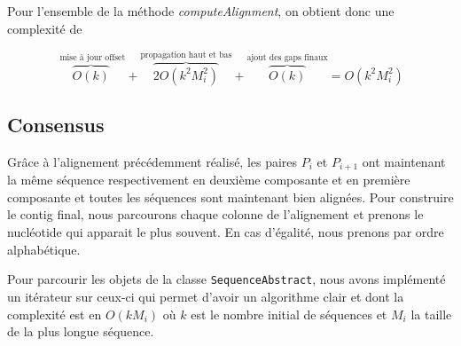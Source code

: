 Pour l'ensemble de la méthode \emph{computeAlignment}, on obtient donc une
complexité de

\begin{equation}
	\overbrace{O(k)}^{\text{ mise à jour offset}} + \overbrace{2 O(k^{2}
	M_{i}^{2})}^{\text{propagation haut et bas}} + \overbrace{O(k)}^{\text{ajout
	des gaps finaux}} = O(k^{2} M_{i}^{2})
\end{equation}


\subsection{Consensus}
\label{subsection:consensus}

Grâce à l'alignement précédemment réalisé, les paires $P_{i}$ et $P_{i + 1}$ ont
maintenant la même séquence respectivement en deuxième composante et en première
composante et toutes les séquences sont maintenant bien alignées. Pour
construire le contig final, nous parcourons chaque colonne de l'alignement
et prenons le nucléotide qui apparait le plus souvent. En cas d'égalité, nous
prenons par ordre alphabétique.

Pour parcourir les objets de la classe \verb|SequenceAbstract|, nous avons
implémenté un itérateur sur ceux-ci qui permet d'avoir un algorithme clair et
dont la complexité est en $O(k M_{i})$ où $k$ est le nombre initial de
séquences et $M_{i}$ la taille de la plus longue séquence.

